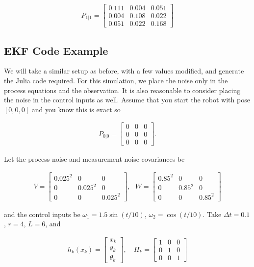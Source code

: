 \[\begin{aligned}
P_{1|1}
=
\begin{bmatrix}
0.111& 0.004& 0.051\\
0.004& 0.108& 0.022\\
0.051& 0.022& 0.168
\end{bmatrix}
\end{aligned}\]

\hypertarget{ekf-code-example}{%
\subsection{EKF Code Example}\label{ekf-code-example}}

We will take a similar setup as before, with a few values modified, and
generate the Julia code required. For this simulation, we place the
noise only in the process equations and the observation. It is also
reasonable to consider placing the noise in the control inputs as well.
Assume that you start the robot with pose \([0,0,0]\) and you know this
is exact so

\[\begin{aligned}
P_{0|0} = \begin{bmatrix} 0 & 0 & 0\\ 0 & 0 & 0 \\ 0 & 0 & 0 \end{bmatrix}.
\end{aligned}\]

Let the process noise and measurement noise covariances be

\[\begin{aligned}
V = \begin{bmatrix} 0.025^2 & 0 & 0 \\ 0 & 0.025^2& 0  \\ 0 & 0 & 0.025^2\end{bmatrix},~~~
W = \begin{bmatrix} 0.85^2 & 0 & 0 \\ 0 & 0.85^2 & 0  \\ 0 & 0 & 0.85^2 \end{bmatrix}
\end{aligned}\]

and the control inputs be \(\omega_1 = 1.5\sin(t/10)\),
\(\omega_2 = \cos(t/10)\). Take \(\Delta t = 0.1\), \(r=4\), \(L = 6\),
and

\[\begin{aligned}
h_k(x_k) = \begin{bmatrix} x_k \\ y_k \\ \theta_k \end{bmatrix}, \quad
H_k = \begin{bmatrix} 1 & 0  & 0  \\
0 & 1  & 0  \\
0 & 0  & 1  \end{bmatrix}
\end{aligned}\]


